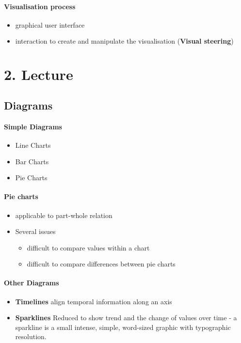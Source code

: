 \documentclass[10pt,a4paper]{article}
\begin{document}
	\paragraph*{Visualisation process} 
	\begin{itemize}
		\item graphical user interface
		\item interaction to create and manipulate the visualisation (\textbf{Visual steering})
	\end{itemize}
	
	\section{2. Lecture}
	
	\subsection{Diagrams}
	\paragraph{Simple Diagrams}
	\begin{itemize}
		\item Line Charts
		\item Bar Charts
		\item Pie Charts
	\end{itemize}

	\paragraph{Pie charts}
	\begin{itemize}
		\item applicable to part-whole relation
		\item Several issues 
		\begin{itemize}
			\item difficult to compare values within a chart
			\item difficult to compare differences between pie charts
		\end{itemize}
	\end{itemize}

	\paragraph{Other Diagrams}
	\begin{itemize}
		\item \textbf{Timelines} align temporal information along an axis
		\item \textbf{Sparklines} Reduced to show trend and the change of values over time - a sparkline is a small intense, simple, word-sized graphic with typographic resolution.
	\end{itemize}
	
\end{document}
